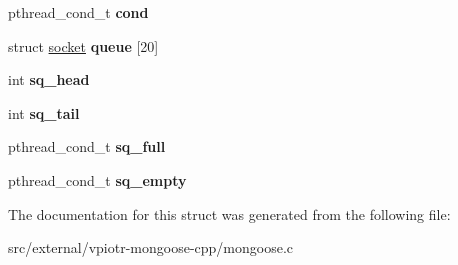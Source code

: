 \begin{DoxyCompactItemize}
\item 
\hypertarget{structmg__context_ae7ffc4f7cdffe0c4341b3bc9bfb699a5}{pthread\-\_\-cond\-\_\-t {\bfseries cond}}\label{structmg__context_ae7ffc4f7cdffe0c4341b3bc9bfb699a5}

\item 
\hypertarget{structmg__context_a1fdc6b1641a5eaa6d45c3140b3752a90}{struct \hyperlink{structsocket}{socket} {\bfseries queue} \mbox{[}20\mbox{]}}\label{structmg__context_a1fdc6b1641a5eaa6d45c3140b3752a90}

\item 
\hypertarget{structmg__context_a3f0d6fd0b413fa48a21d94c9c909b421}{int {\bfseries sq\-\_\-head}}\label{structmg__context_a3f0d6fd0b413fa48a21d94c9c909b421}

\item 
\hypertarget{structmg__context_af62080e6b4cbe517ab7605ee8d175cc5}{int {\bfseries sq\-\_\-tail}}\label{structmg__context_af62080e6b4cbe517ab7605ee8d175cc5}

\item 
\hypertarget{structmg__context_aad49398eacc039c312d58c55530c65fa}{pthread\-\_\-cond\-\_\-t {\bfseries sq\-\_\-full}}\label{structmg__context_aad49398eacc039c312d58c55530c65fa}

\item 
\hypertarget{structmg__context_a3260d5fc8e16e35026d7d2bbcb10abf5}{pthread\-\_\-cond\-\_\-t {\bfseries sq\-\_\-empty}}\label{structmg__context_a3260d5fc8e16e35026d7d2bbcb10abf5}

\end{DoxyCompactItemize}


The documentation for this struct was generated from the following file\-:\begin{DoxyCompactItemize}
\item 
src/external/vpiotr-\/mongoose-\/cpp/mongoose.\-c\end{DoxyCompactItemize}
